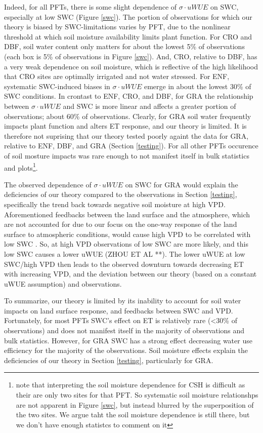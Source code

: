 \documentclass[draft,linenumbers]{gcbjournal}
\begin{document}
Indeed, for all PFTs, there is some slight dependence of $\sigma \cdot uWUE$ on SWC, especially at low SWC (Figure \ref{swc}). The portion of observations for which our theory is biased by SWC-limitations varies by PFT, due to the nonlinear threshold at which soil moisture availability limits plant function. For CRO and DBF, soil water content only matters for about the lowest 5\% of observations (each box is 5\% of observations in Figure \ref{swc}). And, CRO, relative to DBF, has a very weak dependence on soil moisture, which is reflective of the high likelihood that CRO sites are optimally irrigated and not water stressed. For ENF, systematic SWC-induced biases in $\sigma \cdot uWUE$ emerge in about the lowest 30\% of SWC conditions. In crontast to ENF, CRO, and DBF, for GRA the relationship between $\sigma \cdot uWUE$ and SWC is more linear and affects a greater portion of observations; about 60\% of observations. Clearly, for GRA soil water frequently impacts plant function and alters ET response, and our theory is limited. It is therefore not suprising that our theory tested poorly againt the data for GRA, relative to ENF, DBF, and GRA (Section \ref{testing}). For all other PFTs occurence of soil mosture impacts was rare enough to not manifest itself in bulk statistics and plots\footnote{note that interpreting the soil moisture dependence for CSH is difficult as their are only two sites for that PFT. So systematic soil moisture relationshps are not apparent in Figure \ref{swc}, but instead blurred by the superposition of the two sites. We argue taht the soil moisture dependence is still there, but we don't have enough statistcs to comment on it}.

The observed dependence of $\sigma \cdot uWUE$ on SWC for GRA would explain the deficiencies of our theory compared to the observations in Section \ref{testing}, specifically the trend back towards negative soil moisture at high VPD. Aforementioned feedbacks between the land surface and the atmosphere, which are not accounted for due to our focus on the one-way response of the land surface to atmospheric conditions, would cause high VPD to be correlated with low SWC \citep[][]{Gentine_2016, Berg_2016}. So, at high VPD observations of low SWC are more likely, and this low SWC causes a lower uWUE (ZHOU ET AL **). The lower uWUE at low SWC/high VPD then leads to the observed downturn towards decreasing ET with increasing VPD, and the deviation between our theory (based on a constant uWUE assumption) and observations.

To summarize, our theory is limited by its inability to account for soil water impacts on land surface response, and feedbacks between SWC and VPD. Fortunately, for most PFTs SWC's effect on ET is relatively rare (<30\% of observations) and does not manifest itself in the majority of observations and bulk statistics. However, for GRA SWC has a strong effect decreasing water use efficiency for the majority of the observations. Soil moisture effects explain the deficiencies of our theory in Section \ref{testing}, particularly for GRA.
\end{document}
